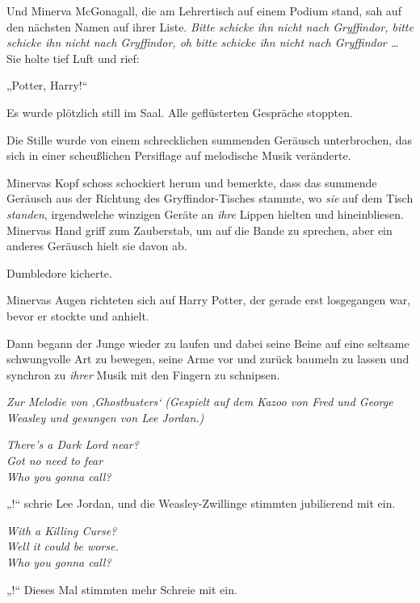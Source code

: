 Und Minerva McGonagall, die am Lehrertisch auf einem Podium stand, sah auf den nächsten Namen auf ihrer Liste. \emph{Bitte schicke ihn nicht nach Gryffindor, bitte schicke ihn nicht nach Gryffindor, \emph{oh bitte} schicke ihn nicht nach Gryffindor …} Sie holte tief Luft und rief:

„Potter, Harry!“

Es wurde plötzlich still im Saal. Alle geflüsterten Gespräche stoppten.

Die Stille wurde von einem schrecklichen summenden Geräusch unterbrochen, das sich in einer scheußlichen Persiflage auf melodische Musik veränderte.

Minervas Kopf schoss schockiert herum und bemerkte, dass das summende Geräusch aus der Richtung des Gryffindor-Tisches stammte, wo \emph{sie} auf dem Tisch \emph{standen}, irgendwelche winzigen Geräte an \emph{ihre} Lippen hielten und hineinbliesen. Minervas Hand griff zum Zauberstab, um  auf die Bande zu sprechen, aber ein anderes Geräusch hielt sie davon ab.

Dumbledore kicherte.

Minervas Augen richteten sich auf Harry Potter, der gerade erst losgegangen war, bevor er stockte und anhielt.

Dann begann der Junge wieder zu laufen und dabei seine Beine auf eine seltsame schwungvolle Art zu bewegen, seine Arme vor und zurück baumeln zu lassen und synchron zu \emph{ihrer} Musik mit den Fingern zu schnipsen.

\begin{center}
\emph{Zur Melodie von ‚Ghostbusters‘}
\emph{(Gespielt auf dem Kazoo von Fred und George Weasley und gesungen von Lee Jordan.)}

\emph{There’s a Dark Lord near?\\
Got no need to fear\\
Who you gonna call?}
\end{center}

„!“ schrie Lee Jordan, und die Weasley-Zwillinge stimmten jubilierend mit ein.

\begin{center}
\emph{With a Killing Curse?\\
Well it could be worse.\\
Who you gonna call?}
\end{center}

„!“ Dieses Mal stimmten mehr Schreie mit ein.

